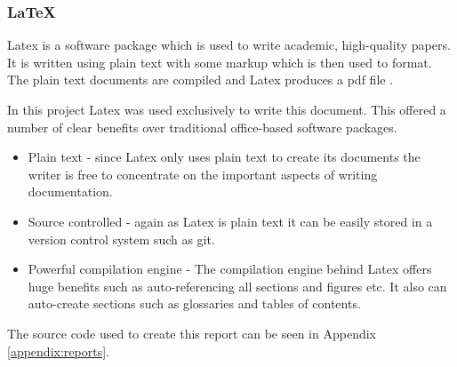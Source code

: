 \subsubsection{LaTeX}
Latex is a software package which is used to write academic, high-quality papers. It is written using plain text with some markup which is then used to format. The plain text documents are compiled and Latex produces a pdf file \citep{Latex2017}.

In this project Latex was used exclusively to write this document. This offered a number of clear benefits over traditional office-based software packages.

\begin{itemize}
	\item Plain text - since Latex only uses plain text to create its documents the writer is free to concentrate on the important aspects of writing documentation.
	\item Source controlled - again as Latex is plain text it can be easily stored in a version control system such as \gls{git}.
	\item Powerful compilation engine - The compilation engine behind Latex offers huge benefits such as auto-referencing all sections and figures etc. It also can auto-create sections such as glossaries and tables of contents.
\end{itemize}

The source code used to create this report can be seen in Appendix \ref{appendix:reports}.
